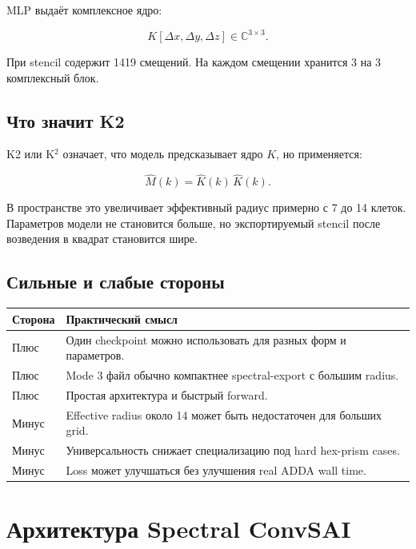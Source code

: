 \documentclass[11pt,a4paper,oneside]{book}
\newcommand{\code}[1]{\texttt{\detokenize{#1}}}
\newcommand{\C}{\mathbb{C}}
\begin{document}
MLP выдаёт комплексное ядро:

\begin{equation}
  K[\Delta x,\Delta y,\Delta z] \in \C^{3\times3}.
\end{equation}

При \code{r_cut=7} stencil содержит 1419 смещений. На каждом смещении хранится
3 на 3 комплексный блок.

\section{Что значит K2}

K2 или K$^2$ означает, что модель предсказывает ядро $K$, но применяется:

\begin{equation}
  \widehat{M}(k) = \widehat{K}(k)\,\widehat{K}(k).
\end{equation}

В пространстве это увеличивает эффективный радиус примерно с 7 до 14 клеток.
Параметров модели не становится больше, но экспортируемый stencil после
возведения в квадрат становится шире.

\section{Сильные и слабые стороны}

\begin{longtable}{p{}p{}}
\toprule
Сторона & Практический смысл \\
\midrule
Плюс & Один checkpoint можно использовать для разных форм и параметров. \\
Плюс & Mode 3 файл обычно компактнее spectral-export с большим radius. \\
Плюс & Простая архитектура и быстрый forward. \\
Минус & Effective radius около 14 может быть недостаточен для больших grid. \\
Минус & Универсальность снижает специализацию под hard hex-prism cases. \\
Минус & Loss может улучшаться без улучшения real ADDA wall time. \\
\bottomrule
\end{longtable}

\chapter{Архитектура Spectral ConvSAI}
\end{document}
